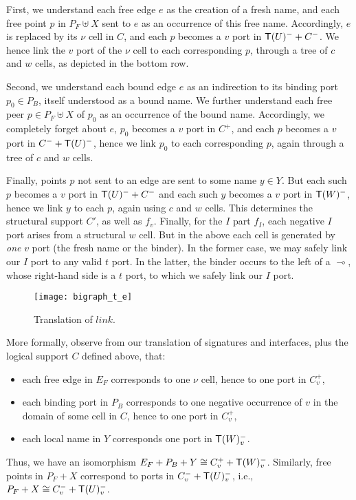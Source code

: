 \documentclass{llncs}
\newcommand{\link}{\mathit{link}}
\newcommand{\iso}{\cong}
\newcommand{\impll}{\multimap}
\begin{document}
First, we understand each free edge $e$ as the creation of a fresh
name, and each free point $p$ in $P_F \uplus X$ sent to $e$ as an
occurrence of this free name. Accordingly, $e$ is replaced by its
$\nu$ cell in $C$, and each $p$ becomes a $v$ port in $\mathsf{T} (U)^- +
C^-$.  We hence link the $v$ port of the $\nu$ cell to each
corresponding $p$, through a tree of $c$ and $w$ cells, as depicted in
the bottom row.

Second, we understand each bound edge $e$ as an indirection to its
binding port $p_0 \in P_B$, itself understood as a bound name. We
further understand each free peer $p \in P_F \uplus X$ of $p_0$ as an
occurrence of the bound name.  Accordingly, we completely forget about
$e$, $p_0$ becomes a $v$ port in $C^+$, and each $p$
becomes a $v$ port in $C^- + \mathsf{T} (U)^-$, hence we link $p_0$ to each
corresponding $p$, again through a tree of $c$ and $w$ cells.

Finally, points $p$ not sent to an edge are sent to some name $y \in
Y$.  But each such $p$ becomes a $v$ port in $\mathsf{T} (U)^- + C^-$ and each
such $y$ becomes a $v$ port in $\mathsf{T} (W)^-$, hence we link $y$ to each
$p$, again using $c$ and $w$ cells.  This determines the structural
support $C'$, as well as $f_v$.  Finally, for the $I$ part $f_I$, each
negative $I$ port arises from a structural $w$ cell. But in
the above each cell is generated by \emph{one} $v$ port (the fresh
name or the binder). In the former case, we may safely link our $I$
port to any valid $t$ port. In the latter, the binder occurs to the
left of a $\impll$, whose right-hand side is a $t$ port, to which we
safely link our $I$ port.

\begin{figure*}[t]\centering
    \texttt{[image: bigraph\_t\_e]}
    \caption{Translation of $\link$.}
    \label{bigraph:t_e}
\end{figure*}

More formally, observe from our translation of signatures and
interfaces, plus the logical support $C$ defined above, that:\begin{itemize}
\item each free edge in $E_F$ corresponds to one $\nu$ cell,
  hence to one port in $C^+_v$,
\item each binding port in $P_B$ corresponds to one negative
  occurrence of $v$ in the domain of some cell in $C$, hence to one
  port in $C^+_v$,
\item each local name in $Y$ corresponds  
  one port in $\mathsf{T} (W)^-_v$.
\end{itemize}
Thus, we have an isomorphism $E_F + P_B + Y \iso C^+_v + \T (W)^-_v$.
Similarly, free points in $P_F + X$ correspond to ports in $C^-_v + \mathsf{T}
(U)^-_v$, i.e., $P_F + X \iso C^-_v + \T (U)^-_v$.
\end{document}
